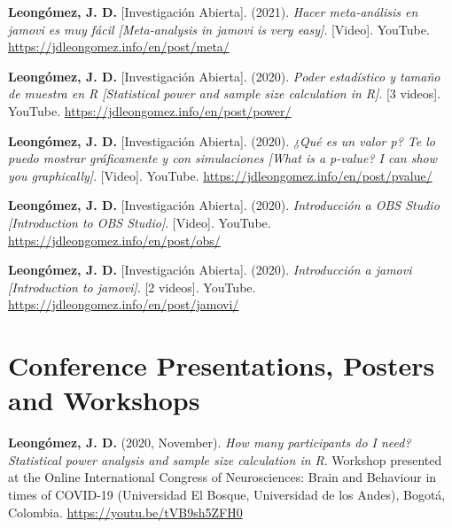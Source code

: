 \documentclass[11pt, a4paper]{awesome-cv}
\begin{document}
\hypertarget{refs_IA}{}
\leavevmode{}%
\textbf{Leongómez, J. D.} {[}Investigación Abierta{]}. (2021).
\emph{{Hacer meta-análisis en jamovi es muy fácil {[}Meta-analysis in
jamovi is very easy{]}}}. {[}Video{]}. YouTube.
\url{https://jdleongomez.info/en/post/meta/}

\leavevmode{}%
\textbf{Leongómez, J. D.} {[}Investigación Abierta{]}. (2020).
\emph{{Poder estadístico y tamaño de muestra en R {[}Statistical power
and sample size calculation in R{]}}}. {[}3 videos{]}. YouTube.
\url{https://jdleongomez.info/en/post/power/}

\leavevmode{}%
\textbf{Leongómez, J. D.} {[}Investigación Abierta{]}. (2020).
\emph{{¿Qué es un valor p? Te lo puedo mostrar gráficamente y con
simulaciones {[}What is a p-value? I can show you graphically{]}}}.
{[}Video{]}. YouTube. \url{https://jdleongomez.info/en/post/pvalue/}

\leavevmode{}%
\textbf{Leongómez, J. D.} {[}Investigación Abierta{]}. (2020).
\emph{{Introducción a OBS Studio {[}Introduction to OBS Studio{]}}}.
{[}Video{]}. YouTube. \url{https://jdleongomez.info/en/post/obs/}

\leavevmode{}%
\textbf{Leongómez, J. D.} {[}Investigación Abierta{]}. (2020).
\emph{{Introducción a jamovi {[}Introduction to jamovi{]}}}. {[}2
videos{]}. YouTube. \url{https://jdleongomez.info/en/post/jamovi/}

\endgroup

\hypertarget{conference-presentations-posters-and-workshops}{%
\section{Conference Presentations, Posters and
Workshops}\label{conference-presentations-posters-and-workshops}}

\begingroup
\setlength{\parindent}{-0.5in}
\setlength{\leftskip}{0.5in}

\textbf{Leongómez, J. D.} (2020, November). \emph{How many participants
do I need? Statistical power analysis and sample size calculation in R}.
Workshop presented at the Online International Congress of
Neurosciences: Brain and Behaviour in times of COVID-19 (Universidad El
Bosque, Universidad de los Andes), Bogotá, Colombia.
\url{https://youtu.be/tVB9sh5ZFH0}
\end{document}
